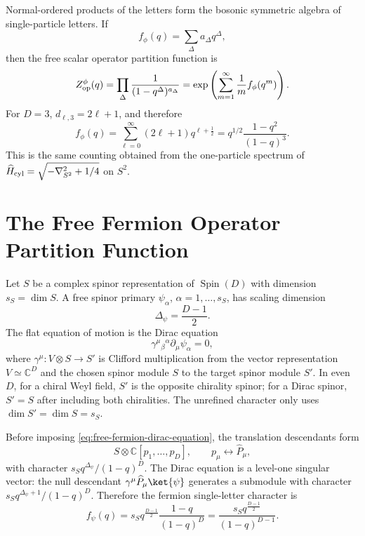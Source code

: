Normal-ordered products of the letters form the bosonic symmetric algebra of
single-particle letters.  If
\[
  f_\phi(q)=\sum_\Delta a_\Delta q^\Delta,
\]
then the free scalar operator partition function is
\begin{equation}
  Z_{\rm op}^{\phi}(q)
  =
  \prod_\Delta
  \frac1{(1-q^\Delta)^{a_\Delta}}
  =
  \exp\left(
    \sum_{m=1}^{\infty}\frac1m f_\phi(q^m)
  \right).
  \label{eq:free-scalar-operator-partition}
\end{equation}
For \(D=3\), \(d_{\ell,3}=2\ell+1\), and therefore
\[
  f_\phi(q)
  =
  \sum_{\ell=0}^{\infty}(2\ell+1)q^{\ell+\frac12}
  =
  q^{1/2}\frac{1-q^2}{(1-q)^3}.
\]
This is the same counting obtained from the one-particle spectrum of
\(\widehat H_{\rm cyl}=\sqrt{-\nabla_{S^2}^2+1/4}\) on \(S^2\).

\section{The Free Fermion Operator Partition Function}
\label{sec:free-fermion-cylinder-partition}

Let \(S\) be a complex spinor representation of \(\operatorname{Spin}(D)\) with dimension
\(s_S=\dim S\).  A free spinor primary
\(\psi_\alpha\), \(\alpha=1,\ldots,s_S\), has scaling dimension
\[
  \Delta_\psi=\frac{D-1}{2}.
\]
The flat equation of motion is the Dirac equation
\begin{equation}
  \gamma^\mu{}_{\beta}{}^\alpha\partial_\mu\psi_\alpha=0,
  \label{eq:free-fermion-dirac-equation}
\end{equation}
where \(\gamma^\mu:V\otimes S\to S'\) is Clifford multiplication from the
vector representation \(V\simeq\mathbb C^D\) and the chosen spinor module
\(S\) to the target spinor module \(S'\).  In even \(D\), for a chiral Weyl
field, \(S'\) is the opposite chirality spinor; for a Dirac spinor,
\(S'=S\) after including both chiralities.  The unrefined character only uses
\(\dim S'=\dim S=s_S\).

Before imposing \eqref{eq:free-fermion-dirac-equation}, the translation
descendants form
\[
  S\otimes\mathbb C[p_1,\ldots,p_D],
  \qquad
  p_\mu\leftrightarrow\widehat P_\mu,
\]
with character \(s_S q^{\Delta_\psi}/(1-q)^D\).  The Dirac equation is a
level-one singular vector: the null descendant
\(\gamma^\mu\widehat P_\mu\ket{\psi}\) generates a submodule with character
\(s_S q^{\Delta_\psi+1}/(1-q)^D\).  Therefore the fermion single-letter
character is
\begin{equation}
  f_\psi(q)
  =
  s_S q^{\frac{D-1}{2}}\frac{1-q}{(1-q)^D}
  =
  \frac{s_S q^{\frac{D-1}{2}}}{(1-q)^{D-1}}.
  \label{eq:free-fermion-letter-character}
\end{equation}

